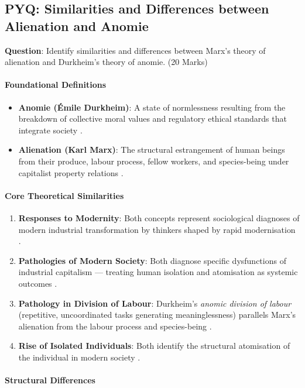 \subsection{PYQ: Similarities and Differences between Alienation and Anomie}

\begin{PYQLink}
\textbf{Question}: Identify similarities and differences between Marx's theory of alienation and Durkheim's theory of anomie. (20 Marks) 
\end{PYQLink}

\paragraph{Foundational Definitions}
\begin{itemize}
    \item \textbf{Anomie (\'Emile Durkheim)}: A state of normlessness resulting from the breakdown of collective moral values and regulatory ethical standards that integrate society .
    \item \textbf{Alienation (Karl Marx)}: The structural estrangement of human beings from their produce, labour process, fellow workers, and species-being under capitalist property relations .
\end{itemize}

\paragraph{Core Theoretical Similarities}
\begin{enumerate}
    \item \textbf{Responses to Modernity}: Both concepts represent sociological diagnoses of modern industrial transformation by thinkers shaped by rapid modernisation .
    \item \textbf{Pathologies of Modern Society}: Both diagnose specific dysfunctions of industrial capitalism --- treating human isolation and atomisation as systemic outcomes .
    \item \textbf{Pathology in Division of Labour}: Durkheim's \textit{anomic division of labour} (repetitive, uncoordinated tasks generating meaninglessness) parallels Marx's alienation from the labour process and species-being .
    \item \textbf{Rise of Isolated Individuals}: Both identify the structural atomisation of the individual in modern society .
\end{enumerate}

\paragraph{Structural Differences}

